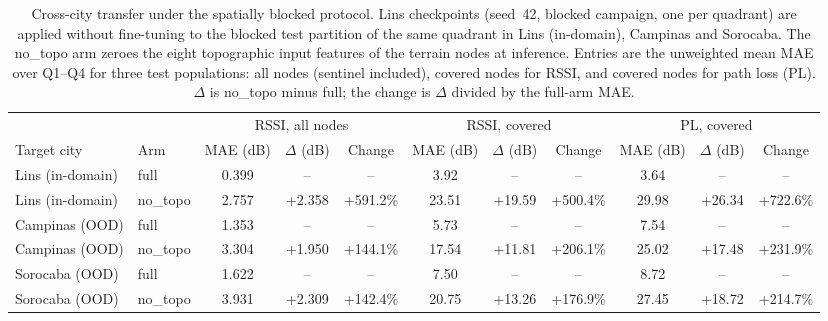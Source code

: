 \begin{table}[t]
\caption{Cross-city transfer under the spatially blocked protocol. Lins checkpoints (seed~42, blocked campaign, one per quadrant) are applied without fine-tuning to the blocked test partition of the same quadrant in Lins (in-domain), Campinas and Sorocaba. The no\_topo arm zeroes the eight topographic input features of the terrain nodes at inference. Entries are the unweighted mean MAE over Q1--Q4 for three test populations: all nodes (sentinel included), covered nodes for RSSI, and covered nodes for path loss (PL). $\Delta$ is no\_topo minus full; the change is $\Delta$ divided by the full-arm MAE.}
\label{tab:ood_blocked}
\centering
\small
\setlength{\tabcolsep}{4pt}
\begin{tabular}{ll ccc ccc ccc}
\toprule
 & & \multicolumn{3}{c}{RSSI, all nodes} & \multicolumn{3}{c}{RSSI, covered} & \multicolumn{3}{c}{PL, covered} \\
\cmidrule(lr){3-5}\cmidrule(lr){6-8}\cmidrule(lr){9-11}
Target city & Arm & MAE (dB) & $\Delta$ (dB) & Change & MAE (dB) & $\Delta$ (dB) & Change & MAE (dB) & $\Delta$ (dB) & Change \\
\midrule
Lins (in-domain) & full & 0.399 & -- & -- & 3.92 & -- & -- & 3.64 & -- & -- \\
Lins (in-domain) & no\_topo & 2.757 & +2.358 & +591.2\% & 23.51 & +19.59 & +500.4\% & 29.98 & +26.34 & +722.6\% \\
\midrule
Campinas (OOD) & full & 1.353 & -- & -- & 5.73 & -- & -- & 7.54 & -- & -- \\
Campinas (OOD) & no\_topo & 3.304 & +1.950 & +144.1\% & 17.54 & +11.81 & +206.1\% & 25.02 & +17.48 & +231.9\% \\
\midrule
Sorocaba (OOD) & full & 1.622 & -- & -- & 7.50 & -- & -- & 8.72 & -- & -- \\
Sorocaba (OOD) & no\_topo & 3.931 & +2.309 & +142.4\% & 20.75 & +13.26 & +176.9\% & 27.45 & +18.72 & +214.7\% \\
\bottomrule
\end{tabular}
\end{table}
